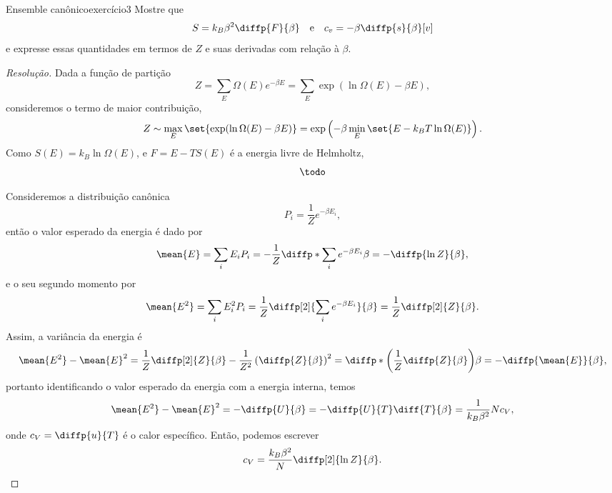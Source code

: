 \begin{exercício}{Ensemble canônico}{exercício3}
    Mostre que
    \begin{equation*}
        S = k_B \beta^2 \diffp{F}{\beta}
        \quad\text{e}\quad
        c_v = - \beta \diffp{s}{\beta}[v]
    \end{equation*}
    e expresse essas quantidades em termos de \(Z\) e suas derivadas com relação à \(\beta\).
\end{exercício}
\begin{proof}[Resolução]
    Dada a função de partição
    \begin{equation*}
        Z = \sum_{E} \Omega(E) e^{-\beta E} = \sum_{E} \exp(\ln \Omega(E) - \beta E),
    \end{equation*}
    consideremos o termo de maior contribuição,
    \begin{equation*}
        Z \sim \max_{E}\set{\exp(\ln \Omega(E) - \beta E)}= \exp\left(-\beta \min_{E}\set{E - k_B T \ln \Omega(E)}\right).
    \end{equation*}
    Como \(S(E) = k_B \ln \Omega(E)\), e \(F = E - TS(E)\) é a energia livre de Helmholtz,
    \begin{equation*}
        \todo
    \end{equation*}

    Consideremos a distribuição canônica
    \begin{equation*}
        P_i = \frac{1}{Z}e^{-\beta E_i},
    \end{equation*}
    então o valor esperado da energia é dado por
    \begin{equation*}
        \mean{E} = \sum_{i} E_i P_i = -\frac{1}{Z} \diffp*{\sum_{i}{e^{-\beta E_i}}}{\beta} = - \diffp{\ln Z}{\beta},
    \end{equation*}
    e o seu segundo momento por
    \begin{equation*}
        \mean{E^2} = \sum_{i} E_i^2 P_i = \frac{1}{Z}\diffp[2]{\sum_i{e^{-\beta E_i}}}{\beta} = \frac{1}{Z} \diffp[2]{Z}{\beta}.
    \end{equation*}
    Assim, a variância da energia é
    \begin{equation*}
        \mean{E^2} - \mean{E}^2 = \frac{1}{Z}\diffp[2]{Z}{\beta} - \frac{1}{Z^2} \left(\diffp{Z}{\beta}\right)^2 = \diffp*{\left(\frac{1}{Z}\diffp{Z}{\beta}\right)}{\beta} = - \diffp{\mean{E}}{\beta},
    \end{equation*}
    portanto identificando o valor esperado da energia com a energia interna, temos
    \begin{equation*}
        \mean{E^2} - \mean{E}^2 = - \diffp{U}{\beta} = -\diffp{U}{T} \diff{T}{\beta} = \frac{1}{k_B \beta^2} N c_V,
    \end{equation*}
    onde \(c_V = \diffp{u}{T}\) é o calor específico. Então, podemos escrever
    \begin{equation*}
        c_V = \frac{k_B \beta^2}{N} \diffp[2]{\ln Z}{\beta}.
    \end{equation*}


\end{proof}
